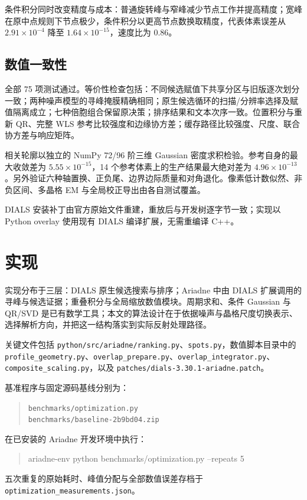 \documentclass[UTF8,11pt,a4paper,fontset=fandol]{ctexart}
\newcommand{\code}[1]{\nolinkurl{#1}}
\begin{document}
条件积分同时改变精度与成本：普通旋转峰与窄峰减少节点工作并提高精度；宽峰在原中点规则下节点极少，条件积分以更高节点数换取精度，代表体素误差从 $2.91\times10^{-4}$ 降至 $1.64\times10^{-15}$，速度比为 0.86。

\subsection{数值一致性}
全部 75 项测试通过。等价性检查包括：不同候选赋值下共享分区与旧版逐次划分一致；两种噪声模型的寻峰掩膜精确相同；原生候选循环的扫描/分辨率选择及赋值隔离成立；七种倍胞组合保留原决策；排序结果和文本次序一致。位置积分与重新 QR、完整 WLS 参考比较强度和边缘协方差；缓存路径比较强度、尺度、联合协方差与响应矩阵。

相关轮廓以独立的 NumPy 72/96 阶三维 Gaussian 密度求积检验。参考自身的最大收敛差为 $5.55\times10^{-15}$，14 个参考体素上的生产结果最大绝对差为 $4.96\times10^{-13}$。另外验证六种轴置换、正负尾、边界边际质量和对角退化。像素低计数似然、非负区间、多晶格 EM 与全局校正导出由各自测试覆盖。

DIALS 安装补丁由官方原始文件重建，重放后与开发树逐字节一致；实现以 Python overlay 使用现有 DIALS 编译扩展，无需重编译 C++。

\section{实现}
实现分布于三层：DIALS 原生候选搜索与排序；Ariadne 中由 DIALS 扩展调用的寻峰与候选证据；重叠积分与全局缩放数值模块。周期求和、条件 Gaussian 与 QR/SVD 是已有数学工具；本文的算法设计在于依据噪声与晶格尺度切换表示、选择解析方向，并把这一结构落实到实际反射处理路径。

关键文件包括 \code{python/src/ariadne/ranking.py}、\code{spots.py}，数值脚本目录中的 \code{profile_geometry.py}、\code{overlap_prepare.py}、\code{overlap_integrator.py}、\code{composite_scaling.py}，以及 \code{patches/dials-3.30.1-ariadne.patch}。

基准程序与固定源码基线分别为：
\begin{quote}\small
\code{benchmarks/optimization.py}\\
\code{benchmarks/baseline-2b9bd04.zip}
\end{quote}
在已安装的 Ariadne 开发环境中执行：
\begin{quote}\small\ttfamily
ariadne-env python benchmarks/optimization.py --repeats 5
\end{quote}
五次重复的原始耗时、峰值分配与全部数值误差存档于 \code{optimization_measurements.json}。
\end{document}
